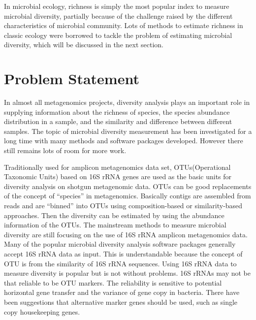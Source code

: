 In microbial ecology, richness is simply the most popular index to measure microbial diversity, partially because of 
the challenge raised by the different characteristics of microbial community. Lots of methods to estimate richness in classic 
ecology were borrowed to tackle the problem of estimating microbial diversity, which will be discussed in the next section.


\section{Problem Statement}


In almost all  metagenomics projects, diversity analysis plays an important
role in supplying information about the richness of species, the species abundance
distribution in a sample, and the similarity and difference between different 
samples.
The topic of microbial diversity measurement
has been investigated for a long time with many methods and software packages
developed. However there still remains lots of room for more work.


Traditionally used for amplicon metagenomics data set, OTUs(Operational 
Taxonomic Units) based on 16S rRNA genes are used as the basic units for 
diversity analysis on shotgun metagenomic data. OTUs can be good replacements of the concept of ``species'' in 
metagenomics. Basically contigs are assembled from reads and are ``binned'' into
OTUs using composition-based or similarity-based approaches. Then the diversity
can be estimated by using the abundance information of the OTUs.
The mainstream methods to measure microbial diversity are still
focusing on the use of 16S rRNA amplicon metagenomics data. 
Many of the
popular microbial diversity analysis software packages generally accept 
16S rRNA data as
input. This is understandable because the concept of OTU is from the
similarity of 16S rRNA sequences. Using 16S rRNA data to measure diversity is
popular but is not without problems. 16S rRNAs may not be that reliable to be
OTU markers. The reliability is sensitive to potential horizontal gene transfer
and the variance of gene copy in bacteria. There have been suggestions that
alternative marker genes should be used, such as single copy housekeeping genes.


